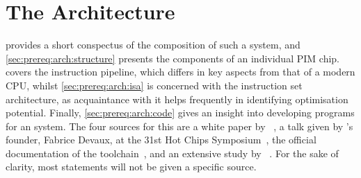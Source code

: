 \section{The \texorpdfstring{\upmem{}}{UPMEM} Architecture}
\label{sec:prereq:arch}

 provides a short conspectus of the composition of such a system, and \cref{sec:prereq:arch:structure} presents the components of an individual \ac{PIM} chip.
 covers the instruction pipeline, which differs in key aspects from that of a modern \ac{CPU}, whilst \cref{sec:prereq:arch:isa} is concerned with the instruction set architecture, as acquaintance with it helps frequently in identifying optimisation potential.
Finally, \cref{sec:prereq:arch:code} gives an insight into developing programs for an \upmem{} system.
The four sources for this  are a white paper by \upmem{}~\cite{upmem2021WhitePaper}, a talk given by \upmem{}'s founder, Fabrice Devaux, at the 31st Hot Chips Symposium~\cite{upmem2019HotChips}, the official documentation of the \upmem{} toolchain~\cite{upmemSDK}, and an extensive study by \citeauthor{mutlu2022Benchmarking}~\cite{mutlu2022Benchmarking}.
For the sake of clarity, most statements will not be given a specific source.










